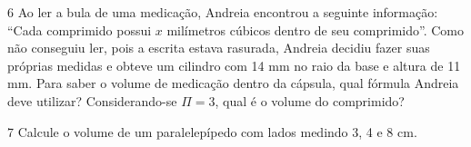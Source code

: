 {{{{%

\num{6} Ao ler a bula de uma medicação, Andreia encontrou a seguinte
informação: ``Cada comprimido possui $x$ milímetros cúbicos dentro de seu comprimido''. Como
não conseguiu ler, pois a escrita estava rasurada, Andreia decidiu fazer
suas próprias medidas e obteve um cilindro com 14 mm no raio da base e altura de 11 mm.
Para saber o volume de medicação dentro da cápsula, qual fórmula Andreia deve utilizar?
Considerando-se $\Pi = 3$, qual é o volume do comprimido?







\num{7} Calcule o volume de um paralelepípedo com lados medindo
3, 4 e 8 cm.


}}}}
